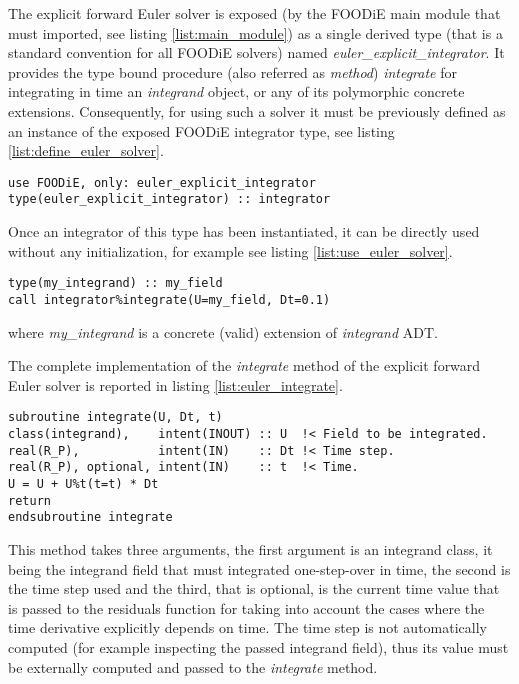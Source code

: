 The explicit forward Euler solver is exposed (by the FOODiE main module that must imported, see listing \ref{list:main_module}) as a single derived type (that is a standard convention for all FOODiE solvers) named \emph{euler\_explicit\_integrator}. It provides the type bound procedure (also referred as \emph{method}) \emph{integrate} for integrating in time an \emph{integrand} object, or any of its polymorphic concrete extensions. Consequently, for using such a solver it must be previously defined as an instance of the exposed FOODiE integrator type, see listing \ref{list:define_euler_solver}.

\begin{lstlisting}[firstnumber=1,style=code,caption={definition of an explicit forward Euler integrator},label={list:define_euler_solver}]
use FOODiE, only: euler_explicit_integrator
type(euler_explicit_integrator) :: integrator
\end{lstlisting}

Once an integrator of this type has been instantiated, it can be directly used without any initialization, for example see listing \ref{list:use_euler_solver}.

\begin{lstlisting}[firstnumber=1,style=code,caption={example of usage of an explicit forward Euler integrator},label={list:use_euler_solver}]
type(my_integrand) :: my_field
call integrator%integrate(U=my_field, Dt=0.1)
\end{lstlisting}
where \emph{my\_integrand} is a concrete (valid) extension of \emph{integrand} ADT.

The complete implementation of the \emph{integrate} method of the explicit forward Euler solver is reported in listing \ref{list:euler_integrate}.

\begin{lstlisting}[firstnumber=1,style=code,caption={implementation of the \emph{integrate} method of Euler solver},label={list:euler_integrate}]
subroutine integrate(U, Dt, t)
class(integrand),    intent(INOUT) :: U  !< Field to be integrated.
real(R_P),           intent(IN)    :: Dt !< Time step.
real(R_P), optional, intent(IN)    :: t  !< Time.
U = U + U%t(t=t) * Dt
return
endsubroutine integrate
\end{lstlisting}
This method takes three arguments, the first argument is an integrand class, it being the integrand field that must integrated one-step-over in time, the second is the time step used and the third, that is optional, is the current time value that is passed to the residuals function for taking into account the cases where the time derivative explicitly depends on time. The time step is not automatically computed (for example inspecting the passed integrand field), thus its value must be externally computed and passed to the \emph{integrate} method.

